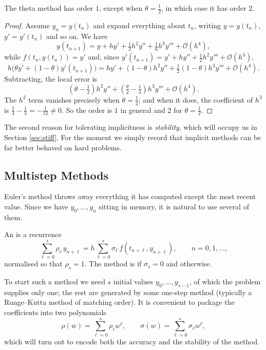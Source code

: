 \documentclass[a4paper]{scrartcl}
\begin{document}
\begin{proposition}
  The theta method has order $1$, except when $\theta = \tfrac12$, in which case it has order $2$.
\end{proposition}
\begin{proof}
  Assume $y_n = y(t_n)$ and expand everything about $t_n$, writing $y = y(t_n)$, $y' = y'(t_n)$ and so on. We have
  $$
  y(t_{n+1}) = y + hy' + \tfrac{1}{2}h^2 y'' + \tfrac16 h^3 y''' + \mathcal{O}(h^4),
  $$
  while $f(t_n, y(t_n)) = y'$ and, since $y'(t_{n+1}) = y' + hy'' + \tfrac12 h^2 y''' + \mathcal{O}(h^3)$,
  $$
  h\Big(\theta y' + (1-\theta)y'(t_{n+1})\Big) = hy' + (1-\theta)h^2 y'' + \tfrac12(1-\theta)h^3 y''' + \mathcal{O}(h^4).
  $$
  Subtracting, the local error is
  $$
  \left(\theta - \tfrac12\right)h^2 y'' + \left(\tfrac{\theta}{2} - \tfrac13\right)h^3y''' + \mathcal{O}(h^4).
  $$
  The $h^2$ term vanishes precisely when $\theta = \tfrac12$; and when it does, the coefficient of $h^3$ is $\tfrac14 - \tfrac13 = -\tfrac1{12} \neq 0$. So the order is $1$ in general and $2$ for $\theta = \tfrac12$.
\end{proof}

The second reason for tolerating implicitness is \emph{stability}, which will occupy us in Section \ref{sec:stiff}. For the moment we simply record that implicit methods can be far better behaved on hard problems.

\subsection{Multistep Methods}

Euler's method throws away everything it has computed except the most recent value. Since we have $y_0, \dots, y_{n}$ sitting in memory, it is natural to use several of them.

\begin{definition}
  An  is a recurrence
  $$
  \sum_{\ell=0}^{s}\rho_\ell\, y_{n+\ell} = h\sum_{\ell=0}^{s}\sigma_\ell\, f(t_{n+\ell}, y_{n+\ell}), \qquad n = 0, 1, \dots,
  $$
  normalised so that $\rho_s = 1$. The method is  if $\sigma_s = 0$ and  otherwise.
\end{definition}

To start such a method we need $s$ initial values $y_0, \dots, y_{s-1}$, of which the problem supplies only one; the rest are generated by some one-step method (typically a Runge--Kutta method of matching order). It is convenient to package the coefficients into two polynomials
$$
\rho(w) = \sum_{\ell=0}^{s}\rho_\ell w^\ell, \qquad \sigma(w) = \sum_{\ell=0}^s \sigma_\ell w^\ell,
$$
which will turn out to encode both the accuracy and the stability of the method.
\end{document}
